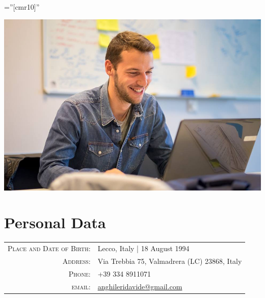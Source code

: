 \documentclass[a4paper,10pt]{article}
\begin{document}

\pagestyle{empty} %

\font\fb=''[cmr10]'' %


\noindent
\begin{minipage}{0.7\textwidth}
\end{minipage}
\begin{minipage}{0.3\textwidth}%
\includegraphics[trim=3cm 3cm 3cm 1cm, clip=true, scale=0.14]{Foto_Davide_EIT}\raggedright
\end{minipage}%
\hfill%



\section{Personal Data}

\begin{tabular}{rl}
    \textsc{Place and Date of Birth:} & Lecco, Italy  | 18 August 1994 \\
    \textsc{Address:}   & Via Trebbia 75, Valmadrera (LC) 23868, Italy \\ %
    \textsc{Phone:}     & +39 334 8911071 \\ %
    \textsc{email:}     & \href{mailto:anghileridavide@gmail.com}{anghileridavide@gmail.com}
\end{tabular}
\end{document}
